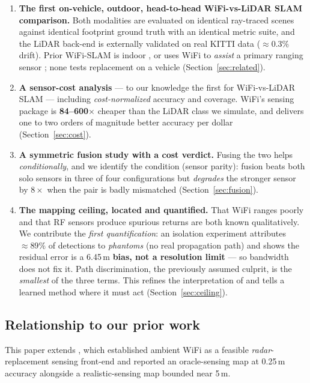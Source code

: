 \documentclass[journal]{IEEEtran}
\newcommand{\SI}[2]{#1\,#2}
\begin{document}
\begin{enumerate}
\item \textbf{The first on-vehicle, outdoor, head-to-head WiFi-vs-LiDAR SLAM
comparison.} Both modalities are evaluated on identical ray-traced scenes against
identical footprint ground truth with an identical metric suite, and the LiDAR
back-end is externally validated on real KITTI data \cite{geiger2012kitti}
($\approx0.3\%$ drift). Prior WiFi-SLAM is indoor \cite{arun2022p2slam}, or uses WiFi
to \emph{assist} a primary ranging sensor \cite{arun2022viwid,ismail2022wifilidarslam};
none tests replacement on a vehicle (Section~\ref{sec:related}).

\item \textbf{A sensor-cost analysis} --- to our knowledge the first for WiFi-vs-LiDAR
SLAM --- including \emph{cost-normalized} accuracy and coverage. WiFi's sensing package
is \textbf{84--600$\times$} cheaper than the LiDAR class we simulate, and delivers one
to two orders of magnitude better accuracy per dollar (Section~\ref{sec:cost}).

\item \textbf{A symmetric fusion study with a cost verdict.} Fusing the two helps
\emph{conditionally}, and we identify the condition (sensor parity): fusion beats both
solo sensors in three of four configurations but \emph{degrades} the stronger sensor by
$8\times$ when the pair is badly mismatched (Section~\ref{sec:fusion}).

\item \textbf{The mapping ceiling, located and quantified.} That WiFi ranges poorly
\cite{li2021csipwr} and that RF sensors produce spurious returns \cite{hong2022radarslam} are
both known qualitatively. We contribute the \emph{first quantification}: an isolation
experiment attributes $\approx89\%$ of detections to \emph{phantoms} (no real propagation
path) and shows the residual error is a \SI{6.45}{m} \textbf{bias, not a resolution limit} ---
so bandwidth does not fix it. Path discrimination, the previously assumed culprit, is the
\emph{smallest} of the three terms. This refines the interpretation of
\cite{fetna2026wifiradar} and tells a learned method where it must act
(Section~\ref{sec:ceiling}).
\end{enumerate}

\subsection{Relationship to our prior work}
This paper extends \cite{fetna2026wifiradar}, which established ambient WiFi as a
feasible \emph{radar}-replacement sensing front-end and reported an oracle-sensing map
at \SI{0.25}{m} accuracy alongside a realistic-sensing map bounded near \SI{5}{m}.
\end{document}

